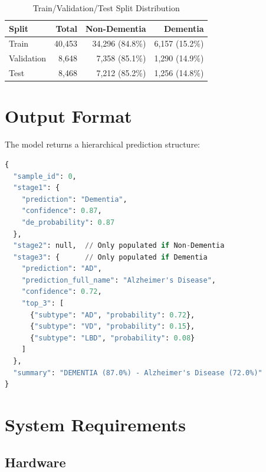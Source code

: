 \documentclass[11pt,a4paper]{article}
\begin{document}
\begin{table}[H]
\centering
\caption{Train/Validation/Test Split Distribution}
\label{tab:splits}
\begin{tabular}{@{}lrrr@{}}
\toprule
\textbf{Split} & \textbf{Total} & \textbf{Non-Dementia} & \textbf{Dementia} \\
\midrule
Train & 40,453 & 34,296 (84.8\%) & 6,157 (15.2\%) \\
Validation & 8,648 & 7,358 (85.1\%) & 1,290 (14.9\%) \\
Test & 8,468 & 7,212 (85.2\%) & 1,256 (14.8\%) \\
\bottomrule
\end{tabular}
\end{table}

\section{Output Format}

The model returns a hierarchical prediction structure:

\begin{lstlisting}[language=Python, caption=Prediction Output Structure]
{
  "sample_id": 0,
  "stage1": {
    "prediction": "Dementia",
    "confidence": 0.87,
    "de_probability": 0.87
  },
  "stage2": null,  // Only populated if Non-Dementia
  "stage3": {      // Only populated if Dementia
    "prediction": "AD",
    "prediction_full_name": "Alzheimer's Disease",
    "confidence": 0.72,
    "top_3": [
      {"subtype": "AD", "probability": 0.72},
      {"subtype": "VD", "probability": 0.15},
      {"subtype": "LBD", "probability": 0.08}
    ]
  },
  "summary": "DEMENTIA (87.0%) - Alzheimer's Disease (72.0%)"
}
\end{lstlisting}

\section{System Requirements}

\subsection{Hardware}
\end{document}
